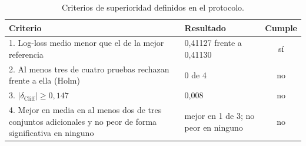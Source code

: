 \documentclass[11pt,a4paper]{article}
\begin{document}
\begin{table}[H]
\centering
\small
\caption{Criterios de superioridad definidos en el protocolo.}
\label{tab:criterios}
\begin{tabular}{p{7.3cm}p{5.2cm}c}
\toprule
Criterio & Resultado & Cumple \\
\midrule
1. Log-loss medio menor que el de la mejor referencia & 0,41127 frente a 0,41130 & sí \\
2. Al menos tres de cuatro pruebas rechazan frente a ella (Holm) & 0 de 4 & no \\
3. $|\delta_{\mathrm{Cliff}}|\ge0{,}147$ & 0,008 & no \\
4. Mejor en media en al menos dos de tres conjuntos adicionales y no peor de forma significativa en ninguno & mejor en 1 de 3; no peor en ninguno & no \\
\bottomrule
\end{tabular}
\end{table}
\end{document}

